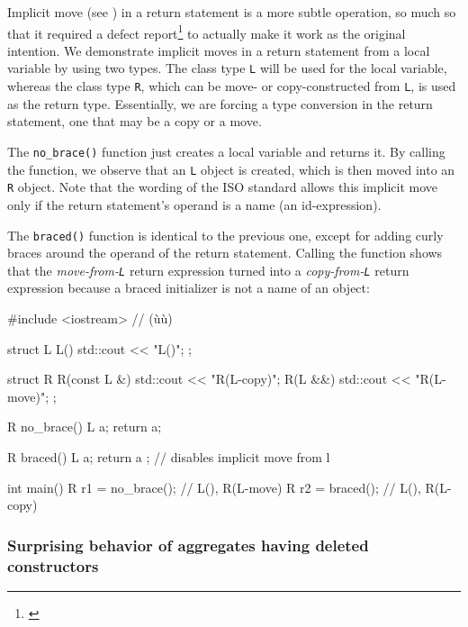 \noindent Implicit move (see ) in a return statement
is a more subtle operation, so much so that it required a defect
report{\cprotect\footnote{\cite{yasskin12}}} to actually
make it work as the original intention. We demonstrate implicit moves in
a return statement from a local variable by using two types. The class
type \lstinline!L! will be used for the local variable, whereas the class
type \lstinline!R!, which can be move- or copy-constructed from \lstinline!L!,
is used as the return type. Essentially, we are forcing a type
conversion in the return statement, one that may be a copy or a move.

The \lstinline!no_brace()! function just creates a local variable and
returns it. By calling the function, we observe that an \lstinline!L!
object is created, which is then moved into an \lstinline!R! object. Note
that the wording of the ISO standard allows this implicit move only if
the return statement's operand is a name (an id-expression).

The \lstinline!braced()! function is identical to the previous one, except
for adding curly braces around the operand of the return statement.
Calling the function shows that the \emph{move-from-\lstinline!L!} return
expression turned into a \emph{copy-from-\lstinline!L!} return expression
because a braced initializer is not a name of an object:

\begin{emcppslisting}
#include <iostream>  // (ù{}ù)

struct L
{
    L()        { std::cout << "L()\n"; }
};

struct R
{
    R(const L &) { std::cout << "R(L-copy)\n"; }
    R(L &&)      { std::cout << "R(L-move)\n"; }
};

R no_brace()
{
    L a;
    return a;
}

R braced()
{
    L a;
    return { a };  // disables implicit move from l
}

int main()
{
    R r1 = no_brace();  // L(), R(L-move)
    R r2 = braced();    // L(), R(L-copy)
}
\end{emcppslisting}
    

\subsubsection[Surprising behavior of aggregates having deleted constructors]{Surprising behavior of aggregates having deleted constructors}\label{surprising-behavior-of-aggregates-having-deleted-constructors}

